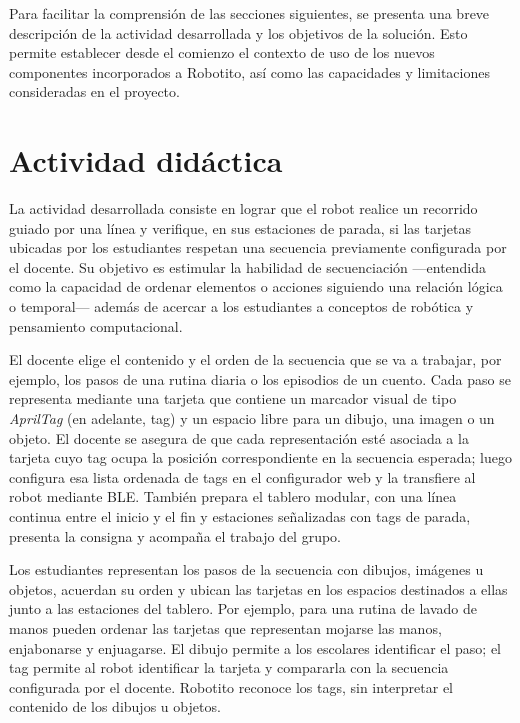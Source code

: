 \documentclass{prgrado}
\begin{document}
Para facilitar la comprensión de las secciones siguientes, se presenta una breve descripción de la actividad desarrollada y los objetivos de la solución. Esto permite establecer desde el comienzo el contexto de uso de los nuevos componentes incorporados a Robotito, así como las capacidades y limitaciones consideradas en el proyecto.

\section{Actividad didáctica}
\label{sec:actividad-didactica}

La actividad desarrollada consiste en lograr que el robot realice un recorrido guiado por una línea y verifique, en sus estaciones de parada, si las tarjetas ubicadas por los estudiantes respetan una secuencia previamente configurada por el docente. Su objetivo es estimular la habilidad de secuenciación —entendida como la capacidad de ordenar elementos o acciones siguiendo una relación lógica o temporal— además de acercar a los estudiantes a conceptos de robótica y pensamiento computacional.

El docente elige el contenido y el orden de la secuencia que se va a trabajar, por ejemplo, los pasos de una rutina diaria o los episodios de un cuento. Cada paso se representa mediante una tarjeta que contiene un marcador visual de tipo \textit{AprilTag} (en adelante, tag) y un espacio libre para un dibujo, una imagen o un objeto. El docente se asegura de que cada representación esté asociada a la tarjeta cuyo tag ocupa la posición correspondiente en la secuencia esperada; luego configura esa lista ordenada de tags en el configurador web y la transfiere al robot mediante BLE. También prepara el tablero modular, con una línea continua entre el inicio y el fin y estaciones señalizadas con tags de parada, presenta la consigna y acompaña el trabajo del grupo.

Los estudiantes representan los pasos de la secuencia con dibujos, imágenes u objetos, acuerdan su orden y ubican las tarjetas en los espacios destinados a ellas junto a las estaciones del tablero. Por ejemplo, para una rutina de lavado de manos pueden ordenar las tarjetas que representan mojarse las manos, enjabonarse y enjuagarse. El dibujo permite a los escolares identificar el paso; el tag permite al robot identificar la tarjeta y compararla con la secuencia configurada por el docente. Robotito reconoce los tags, sin interpretar el contenido de los dibujos u objetos.
\end{document}
